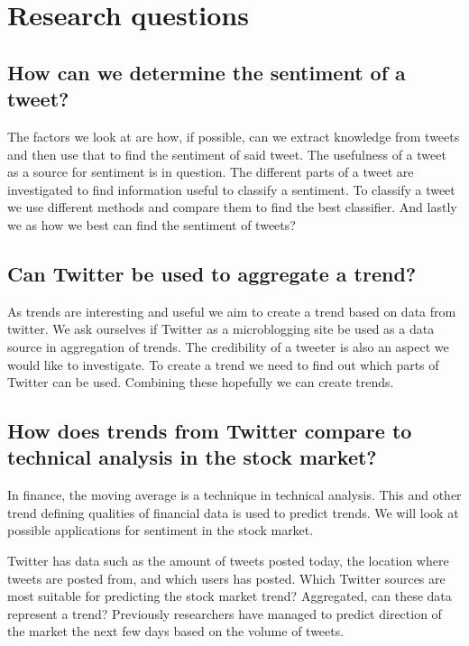 \section{Research questions}\label{introduction:research_questions}

\subsection{How can we determine the sentiment of a
tweet?}\label{introduction:rq1}

The factors we look at are how, if possible, can we extract knowledge from
tweets and then use that to find the sentiment of said tweet. The usefulness of
a tweet as a source for sentiment is in question. The different parts of a
tweet are investigated to find information useful to classify a sentiment. To
classify a tweet we use different methods and compare them to find the best
classifier. And lastly we as how we best can find the sentiment of tweets? 

\subsection{Can Twitter be used to aggregate a
trend?}\label{introduction:rq2}
As trends are interesting and useful we aim to create a trend based on data
from twitter. We ask ourselves if Twitter as a microblogging site be used as a
data source in aggregation of trends. The credibility of a tweeter is also an
aspect we would like to investigate. To create a trend we need to find out
which parts of Twitter can be used. Combining these hopefully we can create
trends. 

\subsection{How does trends from Twitter compare to technical analysis in the
stock market?}\label{introduction:rq3}
In finance, the moving average is a technique in technical analysis. This and
other trend defining qualities of financial data is used to predict trends. We
will look at possible applications for sentiment in the stock market. 

Twitter has data such as the amount of tweets posted today, the location where
tweets are posted from, and which users has posted. Which Twitter sources are
most suitable for predicting the stock market trend? Aggregated, can these data
represent a trend? Previously researchers have managed to predict
direction of the market the next few days based on the volume of tweets.  

